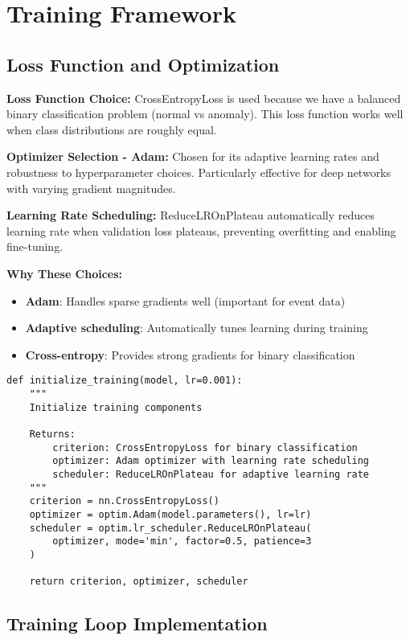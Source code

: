 \documentclass[12pt,a4paper]{article}
\begin{document}
\section{Training Framework}

\subsection{Loss Function and Optimization}

\textbf{Loss Function Choice:} CrossEntropyLoss is used because we have a balanced binary classification problem (normal vs anomaly). This loss function works well when class distributions are roughly equal.

\textbf{Optimizer Selection - Adam:} Chosen for its adaptive learning rates and robustness to hyperparameter choices. Particularly effective for deep networks with varying gradient magnitudes.

\textbf{Learning Rate Scheduling:} ReduceLROnPlateau automatically reduces learning rate when validation loss plateaus, preventing overfitting and enabling fine-tuning.

\textbf{Why These Choices:}
\begin{itemize}
    \item \textbf{Adam}: Handles sparse gradients well (important for event data)
    \item \textbf{Adaptive scheduling}: Automatically tunes learning during training
    \item \textbf{Cross-entropy}: Provides strong gradients for binary classification
\end{itemize}

\begin{lstlisting}[caption={Training Configuration - Optimization Setup}]
def initialize_training(model, lr=0.001):
    """
    Initialize training components
    
    Returns:
        criterion: CrossEntropyLoss for binary classification
        optimizer: Adam optimizer with learning rate scheduling
        scheduler: ReduceLROnPlateau for adaptive learning rate
    """
    criterion = nn.CrossEntropyLoss()
    optimizer = optim.Adam(model.parameters(), lr=lr)
    scheduler = optim.lr_scheduler.ReduceLROnPlateau(
        optimizer, mode='min', factor=0.5, patience=3
    )
    
    return criterion, optimizer, scheduler
\end{lstlisting}

\subsection{Training Loop Implementation}
\end{document}
